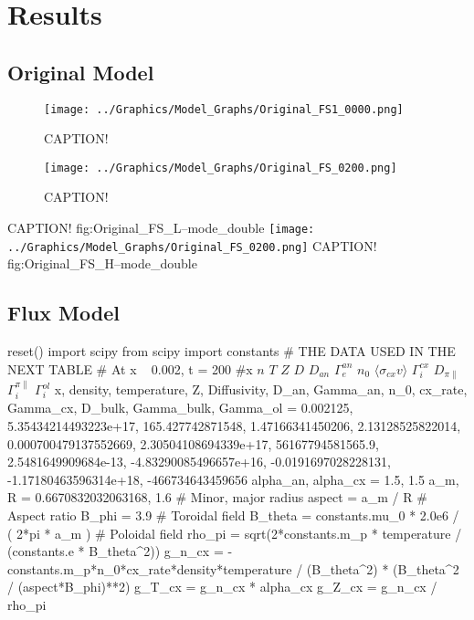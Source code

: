 \chapter{Results}\label{chapter:results}
\section{Original Model} \label{sec:original_results}
\begin{figure}[tb]
	\centering
	\texttt{[image: ../Graphics/Model\_Graphs/Original\_FS1\_0000.png]}
	\caption{CAPTION!}
	\label{fig:Original_FS_L--mode}
\end{figure}
\begin{figure}[tb]
	\centering
	\texttt{[image: ../Graphics/Model\_Graphs/Original\_FS\_0200.png]}
	\caption{CAPTION!}
	\label{fig:Original_FS_H--mode}
\end{figure}

	{CAPTION!}
	{fig:Original_FS_L--mode_double}
	{\texttt{[image: ../Graphics/Model\_Graphs/Original\_FS\_0200.png]}}
	{CAPTION!}
	{fig:Original_FS_H--mode_double}

\section{Flux Model} \label{sec:flux_results}

\begin{sagesilent}
	reset()
	import scipy
	from scipy import constants
	# THE DATA USED IN THE NEXT TABLE
	# At x ~ 0.002, t = 200
	#x	$n$	$T$	$Z$	$D$	$D_{an}$	$\Gamma_e^{an}$	$n_0$	$\langle\sigma_{cx} v\rangle$	$\Gamma_i^{cx}$	$D_{\pi\parallel}$	$\Gamma_i^{\pi\parallel}$	$\Gamma_i^{ol}$
	x, density, temperature, Z, Diffusivity, D_an, Gamma_an, n_0, cx_rate, Gamma_cx, D_bulk, Gamma_bulk, Gamma_ol = 0.002125, 5.35434214493223e+17, 165.427742871548, 1.47166341450206, 2.13128525822014, 0.000700479137552669, 2.30504108694339e+17, 56167794581565.9, 2.5481649909684e-13, -4.83290085496657e+16, -0.0191697028228131, -1.17180463596314e+18, -466734643459656
	alpha_an, alpha_cx = 1.5, 1.5
	a_m, R = 0.6670832032063168, 1.6					# Minor, major radius
	aspect = a_m / R									# Aspect ratio
	B_phi = 3.9											# Toroidal field
	B_theta = constants.mu_0 * 2.0e6 / ( 2*pi * a_m )	# Poloidal field
	rho_pi = sqrt(2*constants.m_p * temperature / (constants.e * B_theta^2))
	g_n_cx = -constants.m_p*n_0*cx_rate*density*temperature / (B_theta^2) * (B_theta^2 / (aspect*B_phi)**2)
	g_T_cx = g_n_cx * alpha_cx
	g_Z_cx = g_n_cx / rho_pi
\end{sagesilent}


